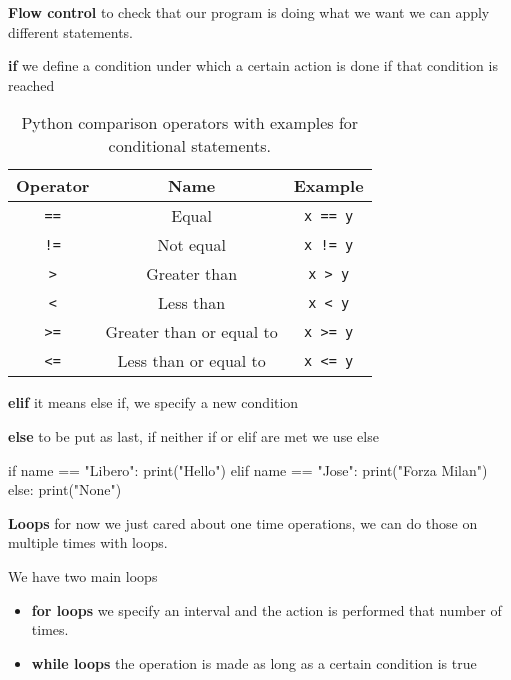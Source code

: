 \vspace{10pt}

\textbf{Flow control} \ra to check that our program is doing what we want we can apply different statements.

\textbf{if} \ra we define a condition under which a certain action is done if that condition is reached

\begin{table}[h!]
\centering
\renewcommand{\arraystretch}{1.3}
\begin{tabular}{|c|c|c|}
\hline
\textbf{Operator} & \textbf{Name} & \textbf{Example} \\
\hline
\texttt{==} & Equal                    & \texttt{x == y} \\
\texttt{!=} & Not equal                & \texttt{x != y} \\
\texttt{>}  & Greater than             & \texttt{x > y}  \\
\texttt{<}  & Less than                & \texttt{x < y}  \\
\texttt{>=} & Greater than or equal to & \texttt{x >= y} \\
\texttt{<=} & Less than or equal to    & \texttt{x <= y} \\
\hline
\end{tabular}
\caption{Python comparison operators with examples for conditional statements.}
\end{table}

\textbf{elif} \ra it means else if, we specify a new condition

\textbf{else} \ra to be put as last, if neither if or elif are met we use else

\begin{pythoncode}
if name == "Libero":
    print("Hello")
elif name == "Jose":
    print("Forza Milan")
else:
    print("None")
\end{pythoncode}


\vspace{10pt}

\textbf{Loops} \ra for now we just cared about one time operations, we can do those on multiple times with loops. 

We have two main loops

\begin{itemize}
    \item \textbf{for loops} \ra we specify an interval and the action is performed that number of times.
    \item \textbf{while loops} \ra the operation is made as long as a certain condition is true
\end{itemize}

